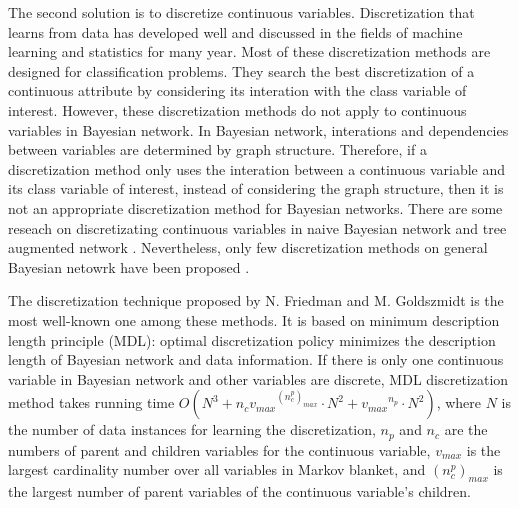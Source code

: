 The second solution is to discretize continuous variables. Discretization that learns from data has developed well and discussed \citep{Dougherty_1995} in the fields of machine learning and statistics for many year. Most of these discretization methods are designed for classification problems. They search the best discretization of a continuous attribute by considering its interation with the class variable of interest. However, these discretization methods do not apply to continuous variables in Bayesian network. In Bayesian network, interations and dependencies between variables are determined by graph structure. Therefore, if a discretization method only uses the interation between a continuous variable and its class variable of interest, instead of considering the graph structure, then it is not an appropriate discretization method for Bayesian networks. There are some reseach on discretizating continuous variables in naive Bayesian network and tree augmented network \citep{Fried_naive}. Nevertheless, only few discretization methods on general Bayesian netowrk have been proposed \citep{Friedman_1996, Kozlov_1997, Monti_1998, Steck_2007}.

The discretization technique proposed by N. Friedman and M. Goldszmidt \citet{Friedman_1996} is the most well-known one among these methods. It is based on minimum description length principle (MDL): optimal discretization policy minimizes the description length of Bayesian network and data information. If there is only one continuous variable in Bayesian network and other variables are discrete, MDL discretization method takes running time $O(N^3 + n_c {v_{max}}^{(n_c^p)_{max}} \cdot N^2 + {v_{max}}^{n_p} \cdot N^2)$, where $N$ is the number of data instances for learning the discretization, $n_p$ and $n_c$ are the numbers of parent and children variables for the continuous variable, $v_{max}$ is the largest cardinality number over all variables in Markov blanket, and  ${(n_c^p)_{max}}$ is the largest number of parent variables of the continuous variable's children.

